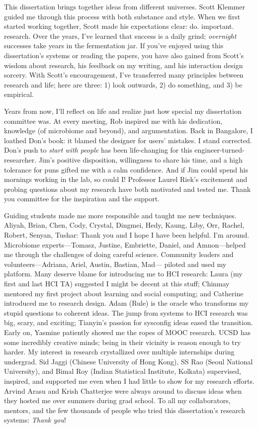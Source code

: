 \begin{frontmatter}
\begin{acknowledgements}
This dissertation brings together ideas from different universes. Scott Klemmer guided me through this process with both substance and style. When we first started working together, Scott made his expectations clear: do. important. research. Over the years, I’ve learned that success is a daily grind; \textit{overnight} successes take years in the fermentation jar. If you’ve enjoyed using this dissertation’s systems or reading the papers, you have also gained from Scott’s wisdom about research, his feedback on my writing, and his interaction design sorcery. With Scott’s encouragement, I’ve transferred many principles between research and life; here are three: 1) look outwards, 2) do something, and 3) be empirical.

Years from now, I'll reflect on life and realize just how special my dissertation committee was. At every meeting, Rob inspired me with his dedication, knowledge (of microbiome and beyond), and argumentation. Back in Bangalore, I loathed Don’s book: it blamed the designer for users’ mistakes. I stand corrected. Don’s push to \textit{start with people} has been life-changing for this engineer-turned-researcher. Jim’s positive disposition, willingness to share his time, and a high tolerance for puns gifted me with a calm confidence. And if Jim could spend his mornings working in the lab, so could I! Professor Laurel Riek’s excitement and probing questions about my research have both motivated and tested me. Thank you committee for the inspiration and the support. 

Guiding students made me more responsible and taught me new techniques. Aliyah, Brian, Chen, Cody, Crystal, Dingmei, Hedy, Kaung, Liby, Orr, Rachel, Robert, Senyan, Tushar: Thank you and I hope I have been helpful. I’m around. Microbiome experts---Tomasz, Justine, Embriette, Daniel, and Amnon---helped me through the challenges of doing careful science. Community leaders and volunteers---Adriana, Ariel, Austin, Bastian, Mad--- piloted and used my platform. Many deserve blame for introducing me to HCI research: Laura (my first and last HCI TA) suggested I might be decent at this stuff; Chinmay mentored my first project about learning and social computing; and Catherine introduced me to research design. Adam (Rule) is the oracle who transforms my stupid questions to coherent ideas. The jump from systems to HCI research was big, scary, and exciting; Tianyin’s passion for sysconfig ideas eased the transition. Early on, Yasmine patiently showed me the ropes of MOOC research. UCSD has some incredibly creative minds; being in their vicinity is reason enough to try harder. My interest in research crystallized over multiple internships during undergrad. Sid Jaggi (Chinese University of Hong Kong), SS Rao (Seoul National University), and Bimal Roy (Indian Statistical Institute, Kolkata) supervised, inspired, and supported me even when I had little to show for my research efforts.  Arvind Arasu and Krish Chatterjee were always around to discuss ideas when they hosted me over summers during grad school. To all my collaborators, mentors, and the few thousands of people who tried this dissertation's research systems: \textit{Thank you}! 


\end{acknowledgements}
\end{frontmatter}
